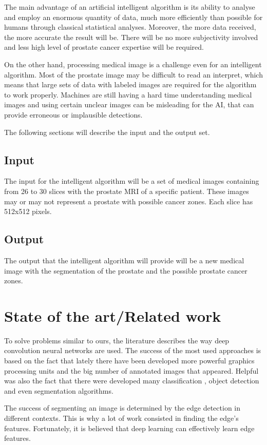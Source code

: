 \documentclass[runningheads,a4paper,11pt]{report}
\begin{document}
The main advantage of an artificial intelligent algorithm is its ability to analyse and employ an enormous quantity of data, much more efficiently than possible for humans through classical statistical analyses. Moreover, the more data received, the more accurate the result will be. There will be no more subjectivity involved and less high level of prostate cancer expertise will be required.\cite{imageProcessing}

On the other hand, processing medical image is a challenge even for an intelligent algorithm. Most of the prostate image may be difficult to read an interpret, which means that large sets of data with labeled images are required for the algorithm to work properly. Machines are still having a hard time understanding medical images and using certain unclear images can be misleading for the AI, that can provide erroneous or implausible detections.

The following sections will describe the input and the output set.

\section{Input }
\label{section:input}

The input for the intelligent algorithm will be a set of medical images containing from 26 to 30 slices with the prostate MRI of a specific patient. These images may or may not represent a prostate with possible cancer zones. Each slice has 512x512 pixels.

\section{Output }
\label{section:output}
The output that the intelligent algorithm will provide will be a new medical image with the segmentation of the prostate and the possible prostate cancer zones.


\chapter{State of the art/Related work}
\label{chapter:stateOfArt}
To solve problems similar to ours, the literature describes the way deep convolution neural networks are used.
The success of the most used approaches is based on the fact that lately there have been developed more powerful graphics processing units and the big number of annotated images that appeared. Helpful was also the fact that there were developed many classification \cite{imagenetClassification}, object detection \cite{largeScaleImageRecognition} and even segmentation \cite{semanticSegmentation} algorithms.\par 
The success of segmenting an image is determined by the edge detection in different contexts. This is why a lot of work consisted in finding the edge's features.\cite{zhang2015ensemble} Fortunately, it is believed that deep learning can effectively learn edge features.\par
\end{document}
